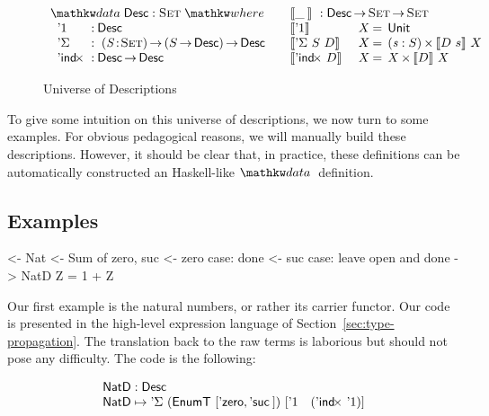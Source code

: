 \begin{figure*}

\[
\begin{array}{ll}
\stk{
\data \Desc : \Set \where \\
\;\;\begin{array}{@{}l@{\::\:}l@{\quad}l}
    \DUnit          & \Desc \\
    \DSigma         & \PI{\V{S}}{\Set} \PIS{S \To \Desc} \Desc \\
    \DIndx          & \Desc \To \Desc
\end{array}
}
&
\stk{
\descop{\_\:}{} : \Desc \To \Set \To \Set \\
\begin{array}{@{}ll@{\:=\:\:}ll}
\descop{\DUnit}{& X}        &  \Unit                                       \\
\descop{\DSigma{S}{D}}{& X} &  \SIGMAS{\V{s} : S}{\descop{D~s}{X}}         \\
\descop{\DIndx{D}}{& X}     &  \TIMES{X}{\descop{D}{X}}
\end{array}
}
\end{array}
\]


\caption{Universe of Descriptions}
\label{fig:desc_universe}

\end{figure*}

To give some intuition on this universe of descriptions, we now turn
to some examples. For obvious pedagogical reasons, we will manually
build these descriptions. However, it should be clear that, in
practice, these definitions can be automatically constructed an
Haskell-like $\data$ definition.

\subsection{Examples}
\label{sec:desc-examples}

\begin{wstructure}
<- Nat
    <- Sum of zero, suc
    <- zero case: done
    <- suc case: leave open and done
    -> NatD Z = 1 + Z
\end{wstructure}

Our first example is the natural numbers, or rather its carrier
functor. Our code is presented in the high-level expression language
of Section~\ref{sec:type-propagation}. The translation back to the raw
terms is laborious but should not pose any difficulty. The code is the
following:

\[\stk{
\NatD : \Desc \\
\NatD \mapsto \DSigma{(\EnumT [ \NatZero, \NatSuc{} ])}
                     {[ \DUnit \quad (\DIndx{\DUnit}) ]}
}\]

